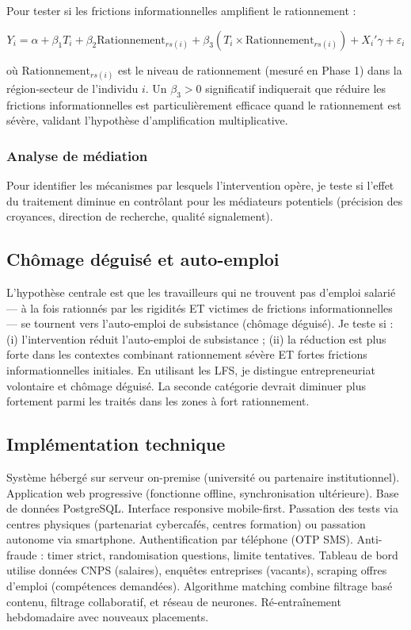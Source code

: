 \documentclass[12pt,a4paper]{article}
\begin{document}
Pour tester si les frictions informationnelles amplifient le rationnement :

\begin{equation}
Y_i = \alpha + \beta_1 T_i + \beta_2 \text{Rationnement}_{rs(i)} + \beta_3 (T_i \times \text{Rationnement}_{rs(i)}) + X_i'\gamma + \varepsilon_i
\end{equation}

où $\text{Rationnement}_{rs(i)}$ est le niveau de rationnement (mesuré en Phase 1) dans la région-secteur de l'individu $i$. Un $\beta_3 > 0$ significatif indiquerait que réduire les frictions informationnelles est particulièrement efficace quand le rationnement est sévère, validant l'hypothèse d'amplification multiplicative.

\subsubsection{Analyse de médiation}

Pour identifier les mécanismes par lesquels l'intervention opère, je teste si l'effet du traitement diminue en contrôlant pour les médiateurs potentiels (précision des croyances, direction de recherche, qualité signalement).

\subsection{Chômage déguisé et auto-emploi}

L'hypothèse centrale est que les travailleurs qui ne trouvent pas d'emploi salarié — à la fois rationnés par les rigidités ET victimes de frictions informationnelles — se tournent vers l'auto-emploi de subsistance (chômage déguisé). Je teste si : (i) l'intervention réduit l'auto-emploi de subsistance ; (ii) la réduction est plus forte dans les contextes combinant rationnement sévère ET fortes frictions informationnelles initiales. En utilisant les LFS, je distingue entrepreneuriat volontaire et chômage déguisé. La seconde catégorie devrait diminuer plus fortement parmi les traités dans les zones à fort rationnement.

\subsection{Implémentation technique}

Système hébergé sur serveur on-premise (université ou partenaire institutionnel). Application web progressive (fonctionne offline, synchronisation ultérieure). Base de données PostgreSQL. Interface responsive mobile-first. Passation des tests via centres physiques (partenariat cybercafés, centres formation) ou passation autonome via smartphone. Authentification par téléphone (OTP SMS). Anti-fraude : timer strict, randomisation questions, limite tentatives. Tableau de bord utilise données CNPS (salaires), enquêtes entreprises (vacants), scraping offres d'emploi (compétences demandées). Algorithme matching combine filtrage basé contenu, filtrage collaboratif, et réseau de neurones. Ré-entraînement hebdomadaire avec nouveaux placements.
\end{document}
